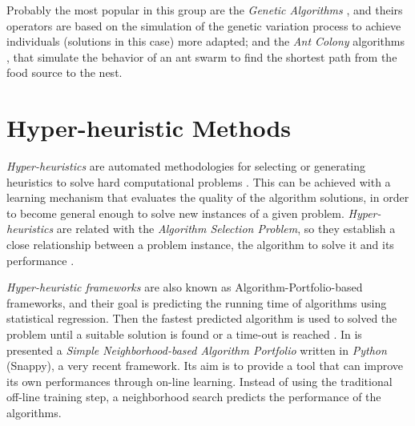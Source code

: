 Probably the most popular in this group are the {\it Genetic Algorithms} \cite{Reeves2010}, and theirs operators are based on the simulation of the genetic variation  process to achieve individuals (solutions in this case) more adapted; and the {\it Ant Colony} algorithms \cite{Dorigo2010}, that simulate the behavior of an ant swarm to find the shortest path from the food source to the nest.

\section{Hyper-heuristic Methods}
\label{sec:hyper}

\textit{Hyper-heuristics} are automated methodologies for selecting or generating heuristics to solve hard computational problems \cite{Chakhlevitch2008}. This can be achieved with a learning mechanism that evaluates the quality of the algorithm solutions, in order to become general enough to solve new instances of a given problem. \textit{Hyper-heuristics} are related with the \textit{Algorithm Selection Problem}, so they establish a close relationship between a problem instance, the algorithm to solve it and its performance \cite{Ryser-welch}.   

\textit{Hyper-heuristic frameworks} are also known as Algorithm-Portfolio-based frameworks, and their goal is predicting the running time of algorithms using statistical regression. Then the fastest predicted algorithm is used to solved the problem until a suitable solution is found or a time-out is reached \cite{Leyton-Brown2003}. In \cite{Samulowitz2013} is presented a \textit{Simple Neighborhood-based Algorithm Portfolio} written in \textit{Python} (Snappy), a very recent framework. Its aim is to provide a tool that can improve its own performances through on-line learning. Instead of using the traditional off-line training step, a neighborhood search predicts the performance of the algorithms.


